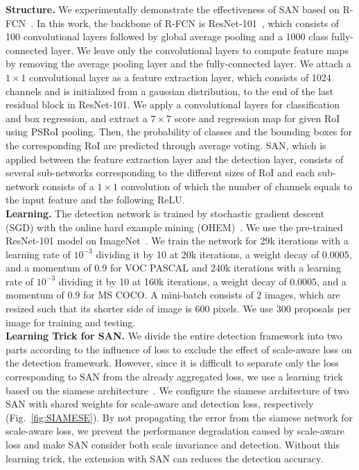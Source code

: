 \documentclass[runningheads]{llncs}
\begin{document}
\noindent
\textbf{Structure.}
We experimentally demonstrate the effectiveness of SAN based on R-FCN~\cite{li2016r}.
In this work, the backbone of R-FCN is ResNet-101~\cite{he2016deep}, which consists of 100 convolutional layers followed by global average pooling and a 1000 class fully-connected layer.
We leave only the convolutional layers to compute feature maps by removing the average pooling layer and the fully-connected layer.
We attach a $1\times1$ convolutional layer as a feature extraction layer, which consists of 1024 channels and is initialized from a gaussian distribution, to the end of the last residual block in ResNet-101.
We apply a convolutional layers for classification and box regression, and extract a $7\times7$ score and regression map for given RoI using PSRoI pooling.
Then, the probability of classes and the bounding boxes for the corresponding RoI are predicted through average voting.
SAN, which is applied between the feature extraction layer and the detection layer, consists of several sub-networks corresponding to the different sizes of RoI and each sub-network consists of a $1\times1$ convolution of which the number of channels equals to the input feature and the following ReLU.
\\

\noindent\textbf{Learning.}
The detection network is trained by stochastic gradient descent (SGD) with the online hard example mining (OHEM)~\cite{shrivastava2016training}.
We use the pre-trained ResNet-101 model on ImageNet~\cite{russakovsky2015imagenet}.
We train the network for
29k iterations with a learning rate of $10^{-3}$ dividing it by 10 at 20k iterations, a weight decay of $0.0005$, and a momentum of $0.9$ for VOC PASCAL 
and
240k iterations with a learning rate of $10^{-3}$ dividing it by 10 at 160k iterations, a weight decay of $0.0005$, and a momentum of $0.9$ for MS COCO.
A mini-batch consists of 2 images, which are resized such that its shorter side of image is 600 pixels.
We use 300 proposals per image for training and testing.
\\


\noindent
\textbf{Learning Trick for SAN.}
We divide the entire detection framework into two parts according to the influence of loss to exclude the effect of scale-aware loss on the detection framework.
However, since it is difficult to separate only the loss corresponding to SAN from the already aggregated loss, we use a learning trick based on the siamese architecture~\cite{chopra2005learning}.
We configure the siamese architecture of two SAN with shared weights for scale-aware and detection loss, respectively (Fig.~\ref{fig:SIAMESE}).
By not propagating the error from the siamese network for scale-aware loss, we prevent the performance degradation caused by scale-aware loss and make SAN consider both scale invariance and detection.
Without this learning trick, the extension with SAN can reduces the detection accuracy.
\\
\end{document}
